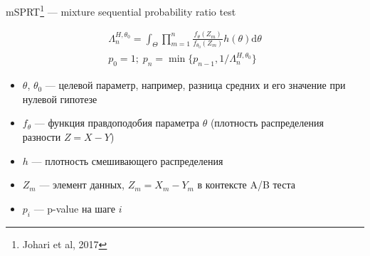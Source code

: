 \documentclass[12pt, unicode]{beamer}
\begin{document}
	\begin{frame}[fragile]{mSPRT\footnote[1]{Johari et al, 2017
			} --- mixture sequential probability ratio test}
		\begin{block}{}
			\vspace*{-0.8cm}
			\begin{equation*}
				\begin{aligned}
					\Lambda_{n}^{H,\theta_0}=\int_{\Theta}\prod\limits_{m=1}^{n}\frac{f_{\theta}(Z_m)}{f_{\theta_0}(Z_m)}h(\theta)\mathrm{d}\theta\\
					p_0=1;\;p_n=\min\{p_{n-1},1/\Lambda_{n}^{H,\theta_0}\}
				\end{aligned}
			\end{equation*}
			\vspace*{-0.5cm}
			\begin{itemize}
				\item $\theta$, $\theta_0$ --- целевой параметр, например, разница средних и его значение при нулевой гипотезе
				\item $f_{\theta}$ --- функция правдоподобия параметра $\theta$ (плотность распределения разности $Z=X-Y$)
				\item $h$ --- плотность смешивающего распределения
				\item $Z_m$ --- элемент данных, $Z_m = X_m - Y_m$ в контексте A/B теста
				\item $p_i$ --- p-value на шаге $i$
			\end{itemize}
			\vspace*{-0.5cm}
		\end{block}
		\vfill\null
	\end{frame}

	
\end{document}
